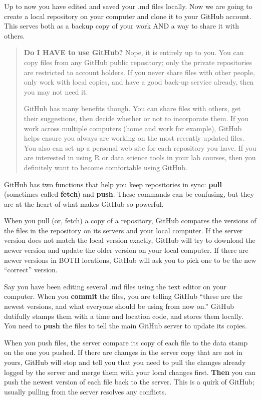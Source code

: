 \documentclass[
]{article}
\begin{document}
Up to now you have edited and saved your .md files locally. Now we are
going to create a local repository on your computer and clone it to your
GitHub account. This serves both as a backup copy of your work AND a way
to share it with others.

\begin{quote}
\textbf{Do I HAVE to use GitHub?} Nope, it is entirely up to you. You
can copy files from any GitHub public repository; only the private
repositories are restricted to account holders. If you never share files
with other people, only work with local copies, and have a good back-up
service already, then you may not need it.

GitHub has many benefits though. You can share files with others, get
their suggestions, then decide whether or not to incorporate them. If
you work across multiple computers (home and work for example), GitHub
helps ensure you always are working on the most recently updated files.
You also can set up a personal web site for each repository you have. If
you are interested in using R or data science tools in your lab courses,
then you definitely want to become comfortable using GitHub.
\end{quote}

GitHub has two functions that help you keep repositories in sync:
\textbf{pull} (sometimes called \textbf{fetch}) and \textbf{push}. These
commands can be confusing, but they are at the heart of what makes
GitHub so powerful.

When you pull (or, fetch) a copy of a repository, GitHub compares the
versions of the files in the repository on its servers and your local
computer. If the server version does not match the local version
exactly, GitHub will try to download the newer version and update the
older version on your local computer. If there are newer versions in
BOTH locations, GitHub will ask you to pick one to be the new
``correct'' version.

Say you have been editing several .md files using the text editor on
your computer. When you \textbf{commit} the files, you are telling
GitHub ``these are the newest versions, and what everyone should be
using from now on.'' GitHub dutifully stamps them with a time and
location code, and stores them locally. You need to \textbf{push} the
files to tell the main GitHub server to update its copies.

When you push files, the server compare its copy of each file to the
data stamp on the one you pushed. If there are changes in the server
copy that are not in yours, GitHub will stop and tell you that you need
to pull the changes already logged by the server and merge them with
your local changes first. \textbf{Then} you can push the newest version
of each file back to the server. This is a quirk of GitHub; usually
pulling from the server resolves any conflicts.
\end{document}
